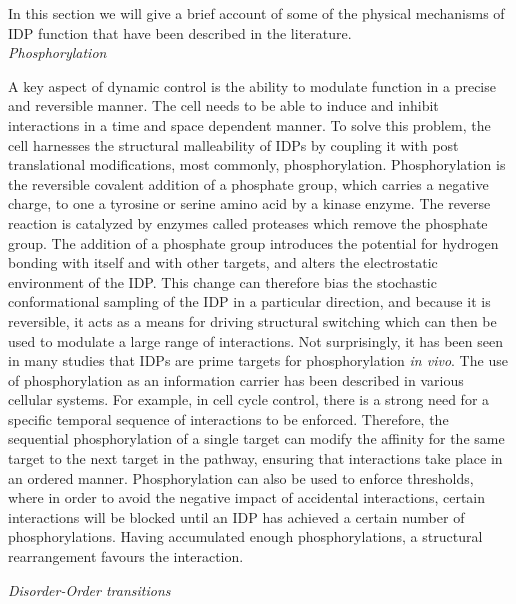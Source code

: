 In this section we will give a brief account of some of the physical mechanisms of IDP function that have been described in the literature. \\

{\it Phosphorylation}

A key aspect of dynamic control is the ability to modulate function in a precise and reversible manner.  The cell needs to be able to induce and inhibit interactions in a time and space dependent manner. To solve this problem, the cell harnesses the structural malleability of IDPs by coupling it with post translational modifications, most commonly, phosphorylation. Phosphorylation is the reversible covalent addition of a phosphate group, which carries a negative charge, to one a tyrosine or serine amino acid by a kinase enzyme. The reverse reaction is catalyzed by enzymes called proteases which remove the phosphate group. The addition of a phosphate group introduces the potential for hydrogen bonding with itself and with other targets, and alters the electrostatic environment of the IDP. This change can therefore bias the stochastic conformational sampling of the IDP in a particular direction, and because it is reversible, it acts as a means for driving structural switching which can then be used to modulate a large range of interactions. Not surprisingly, it has been seen in many studies that IDPs are prime targets for phosphorylation {\it in vivo}.  The use of phosphorylation as an information carrier has been described in various cellular systems. For example, in cell cycle control, there is a strong need for a specific temporal sequence of interactions to be enforced. Therefore, the sequential phosphorylation of a single target can modify the affinity for the same target to the next target in the pathway, ensuring that interactions take place in an ordered manner. Phosphorylation can also be used to enforce thresholds, where in order to avoid the negative impact of accidental interactions, certain interactions will be blocked until an IDP has achieved a certain number of phosphorylations. Having accumulated enough phosphorylations, a structural rearrangement favours the interaction. 

{\it Disorder-Order transitions}

